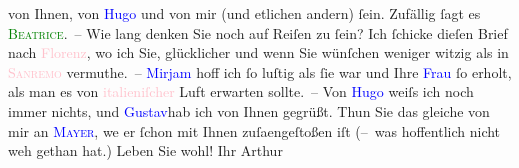                von Ihnen, von \textcolor{blue}{Hugo}{}\ledrightnote{\textcolor{blue}{Hugo von Hofmannsthal}} und von mir \introOben{}(und etlichen andern)\introOben{} ſein. Zufällig ſagt es \textcolor{green}{\textsc{Beatrice}}{}. –\pend
           \pstart
           Wie lang denken Sie noch auf Reiſen zu ſein? Ich ſchicke {\pb}dieſen Brief nach \textcolor{pink}{Florenz}{}\ledrightnote{\textcolor{pink}{Florenz}}, wo ich Sie, glücklicher und wenn Sie wünſchen weniger witzig als in
                  \textcolor{pink}{\textsc{Sanremo}}{}\ledrightnote{\textcolor{pink}{Sanremo}} vermuthe. – \textcolor{blue}{Mirjam}{}\ledrightnote{\textcolor{blue}{Mirjam Beer-Hofmann}} hoff ich ſo luſtig als
               ſie war und Ihre \textcolor{blue}{Frau}{} ſo
               erholt, als man es von \textcolor{pink}{italieniſcher}{}\ledrightnote{\textcolor{pink}{Italien}} Luft erwarten
               sollte. –\pend
           \pstart
           Von \textcolor{blue}{Hugo}{}\ledrightnote{\textcolor{blue}{Hugo von Hofmannsthal}} weiſs ich noch immer nichts, und \textcolor{blue}{Gustav}{}\ledrightnote{\textcolor{blue}{Gustav Schwarzkopf}}{ }{\pb}hab ich von Ihnen gegrüßt. Thun Sie das gleiche von
               mir an \textcolor{blue}{\textsc{Mayer}}{}\ledrightnote{\textcolor{blue}{Oskar Mayer}}, we{\geminationn} er ſchon mit Ihnen zuſa{\geminationm}engeſtoßen iſt (– was hoffentlich nicht weh gethan
               hat.)\pend
           \pstart
           Leben Sie wohl!\pend
           \pstart Ihr \spacefill\mbox{Arthur}\pend{}\endnumbering{}  
      